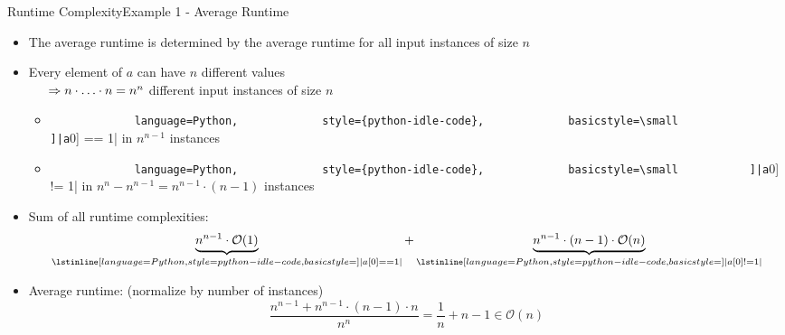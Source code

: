 
\begin{frame}{Runtime Complexity}{Example 1 - Average Runtime}
  \begin{itemize}
    \item
      The {\color{Mittel-Blau}average runtime} is determined by the average
      runtime for all input instances of size $n$
    \item<2->
      Every element of $a$ can have $n$ different values\\
      \begin{math}
        \hspace{1.5em}\Rightarrow n \cdot \ldots \cdot n = n^n
      \end{math}
      different input instances of size $n$
      \begin{itemize}
        \item<3->
          \lstinline[
            language=Python,
            style={python-idle-code},
            basicstyle=\small
            ]|a[0] == 1|
          in $n^{n-1}$ instances
        \item<4->
          \lstinline[
            language=Python,
            style={python-idle-code},
            basicstyle=\small
          ]|a[0] != 1|
          in $n^n - n^{n-1} = n^{n-1} \cdot (n-1)$ instances
      \end{itemize}
    \item<5->
      Sum of all runtime complexities:
      \begin{displaymath}
        \underbrace{n^{n-1} \cdot \mathcal{O}(1)\vphantom{()}}_{
          \lstinline[
            language=Python,
            style={python-idle-code},
            basicstyle=\small
          ]|a[0] == 1|
        } + \underbrace{n^{n-1} \cdot (n-1) \cdot \mathcal{O}(n)}_{
          \lstinline[
            language=Python,
            style={python-idle-code},
            basicstyle=\small
          ]|a[0] != 1|
        }
      \end{displaymath}
    \item<6->
      {\color{Mittel-Blau}Average runtime}: {\footnotesize (normalize by
      number of instances)}
      \begin{displaymath}
        \frac{n^{n-1} + n^{n-1} \cdot (n-1) \cdot n}{n^n}
        = \frac{1}{n} + n - 1
        \in \mathcal{O}(n)
      \end{displaymath}
  \end{itemize}
\end{frame}

